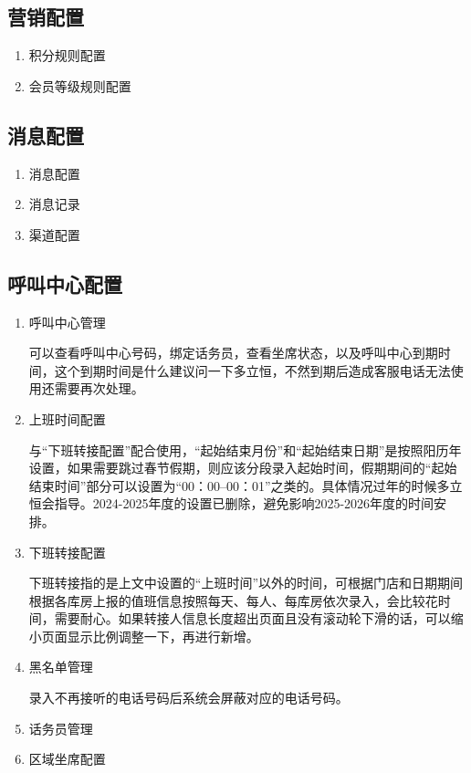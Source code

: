 \documentclass[UTF8]{ctexart}
\begin{document}
\subsection{营销配置}

\begin{enumerate}
	\item 积分规则配置
	
	\item 会员等级规则配置
	
\end{enumerate}


\subsection{消息配置}

\begin{enumerate}
	\item 消息配置
	
	\item 消息记录
	
	\item 渠道配置
	
\end{enumerate}


\subsection{呼叫中心配置}

\begin{enumerate}
	\item 呼叫中心管理
	
	可以查看呼叫中心号码，绑定话务员，查看坐席状态，以及呼叫中心到期时间，这个到期时间是什么建议问一下多立恒，不然到期后造成客服电话无法使用还需要再次处理。
	
	\item 上班时间配置
	
	与“下班转接配置”配合使用，“起始结束月份”和“起始结束日期”是按照阳历年设置，如果需要跳过春节假期，则应该分段录入起始时间，假期期间的“起始结束时间”部分可以设置为“00：00--00：01”之类的。具体情况过年的时候多立恒会指导。2024-2025年度的设置已删除，避免影响2025-2026年度的时间安排。
	
	\item 下班转接配置
	
	下班转接指的是上文中设置的“上班时间”以外的时间，可根据门店和日期期间根据各库房上报的值班信息按照每天、每人、每库房依次录入，会比较花时间，需要耐心。如果转接人信息长度超出页面且没有滚动轮下滑的话，可以缩小页面显示比例调整一下，再进行新增。
	
	\item 黑名单管理
	
	录入不再接听的电话号码后系统会屏蔽对应的电话号码。
	
	\item 话务员管理
	
	\item 区域坐席配置
	
\end{enumerate}
\end{document}

